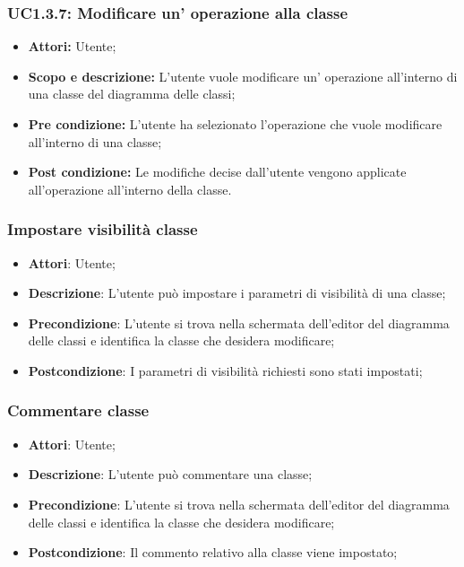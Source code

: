 \documentclass[../AnalisiDeiRequisiti.tex]{subfiles}
\begin{document}
	\subsubsection{UC1.3.7: Modificare un' operazione alla classe}
	\begin{itemize}
		\item \textbf{Attori:} Utente;
		\item \textbf{Scopo e descrizione: }L'utente vuole modificare un' operazione all'interno di una classe del diagramma delle classi;
		\item \textbf{Pre condizione: }L'utente ha selezionato l'operazione che vuole modificare all'interno di una classe;
		\item \textbf{Post condizione: }Le modifiche decise dall'utente vengono applicate all'operazione all'interno della classe.
	\end{itemize}
	
	
	\subsubsection{Impostare visibilità classe}
	\begin{itemize}
		\item \textbf{Attori}: Utente;
		\item \textbf{Descrizione}: L'utente può impostare i parametri di visibilità di una classe;
		\item \textbf{Precondizione}: L’utente si trova nella schermata dell’editor del diagramma delle classi e identifica la classe che desidera modificare;
		\item \textbf{Postcondizione}: I parametri di visibilità richiesti sono stati impostati;
	\end{itemize}
	
	\subsubsection{Commentare classe}
	\begin{itemize}
		\item \textbf{Attori}: Utente;
		\item \textbf{Descrizione}: L'utente può commentare una classe;
		\item \textbf{Precondizione}: L’utente si trova nella schermata dell’editor del diagramma delle classi e identifica la classe che desidera modificare;
		\item \textbf{Postcondizione}: Il commento relativo alla classe viene impostato;
	\end{itemize}
	
\end{document}

